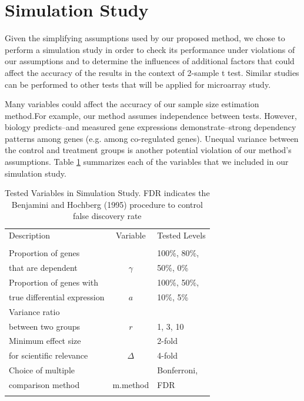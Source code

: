 \documentclass[12pt]{article}
\begin{document}
\section{Simulation Study}

Given the simplifying assumptions used by our proposed method, we
chose to perform a simulation study in order to check its
performance under violations of our assumptions and to determine
the influences of additional factors that could affect the
accuracy of the results in the context of 2-sample t test. Similar
studies can be performed to other tests that will be applied for
microarray study.

Many variables could affect the accuracy of our sample size
estimation method.For example, our method assumes independence
between tests. However, biology predicts--and measured gene
expressions demonstrate--strong dependency patterns among genes
(e.g. among co-regulated genes).  Unequal variance between the
control and treatment groups is another potential violation of our
method's assumptions.  Table \ref{tb:SimuVariables} summarizes
each of the variables that we included in our simulation study.

\begin{table}
  \caption{Tested Variables in Simulation Study.
    FDR indicates the Benjamini and Hochberg
    (1995) procedure to
    control false discovery rate}
  \label{tb:SimuVariables}
  \centering
  \vspace{0.1in}
  \begin{tabular}{lcl}
    Description & Variable & Tested Levels \\
    \\
    \hline\hline
    Proportion of genes &          & 100\%, 80\%,  \\
    that are dependent  & $\gamma$ & 50\%,   0\%    \\
    \hline
    Proportion of genes with     &     &  100\%, 50\%,\\
    true differential expression & $a$ &   10\%,  5\% \\
    \hline
    Variance ratio &  &\\
    between two groups & $r$ & 1, 3, 10  \\
    \hline
    Minimum effect size  & &2-fold \\
    for scientific relevance & $\Delta$ & 4-fold \\
    \hline
    Choice of multiple  & & Bonferroni,  \\
    comparison method & m.method & FDR \\
    \hline\hline\\
  \end{tabular}
\end{table}
\end{document}
